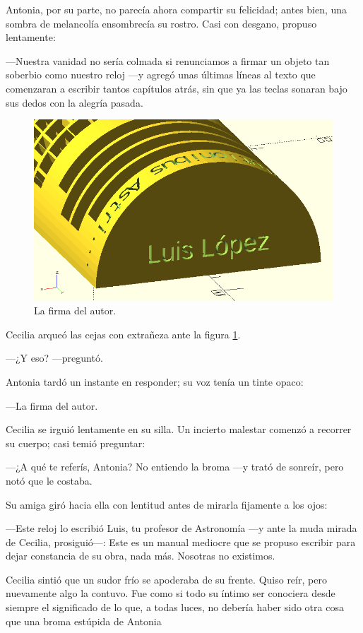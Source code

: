 Antonia, por su parte, no parecía ahora compartir su felicidad; antes
bien, una sombra de melancolía ensombrecía su rostro. Casi con
desgano, propuso lentamente:

---Nuestra vanidad no sería colmada si renunciamos a firmar un objeto
tan soberbio como nuestro reloj ---y agregó unas últimas líneas al
texto que comenzaran a escribir tantos capítulos atrás, sin que ya las
teclas sonaran bajo sus dedos con la alegría pasada.


\begin{figure}[ht]
  \centering
  \includegraphics[width=.6\textwidth]{imagenes/firma}  
  \caption{La firma del autor.}
  \label{fig:firma}
\end{figure}


Cecilia arqueó las cejas con extrañeza ante la figura \ref{fig:firma}.

---¿Y eso?  ---preguntó.

Antonia tardó un instante en responder; su voz tenía un tinte opaco:

---La firma del autor.

Cecilia se irguió lentamente en su silla. Un incierto malestar comenzó
a recorrer su cuerpo; casi temió preguntar:

---¿A qué te referís, Antonia? No entiendo la broma ---y trató de
sonreír, pero notó que le costaba.

Su amiga giró hacia ella con lentitud antes de mirarla fijamente a los
ojos:

---Este reloj lo escribió Luis, tu profesor de Astronomía ---y ante la
muda mirada de Cecilia, prosiguió---: Este es un manual mediocre que
se propuso escribir para dejar constancia de su obra, nada
más. Nosotras no existimos.

Cecilia sintió que un sudor frío se apoderaba de su frente. Quiso
reír, pero nuevamente algo la contuvo. Fue como si todo su íntimo ser
conociera desde siempre el significado de lo que, a todas luces, no
debería haber sido otra cosa que una broma estúpida de Antonia

